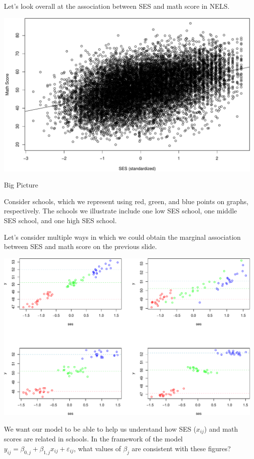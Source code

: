 \documentclass[ignorenonframetext,]{beamer}
\begin{document}
\begin{frame}{}

Let's look overall at the association between SES and math score in
NELS.

\includegraphics[width=0.8\linewidth]{anova_06_deck_files/figure-beamer/scatter-1}

\end{frame}

\begin{frame}{Big Picture}

Consider schools, which we represent using red, green, and blue points
on graphs, respectively. The schools we illustrate include one low SES
school, one middle SES school, and one high SES school.

Let's consider multiple ways in which we could obtain the marginal
association between SES and math score on the previous slide.

\end{frame}

\begin{frame}{}

\includegraphics[width=0.6\linewidth]{anova_06_deck_files/figure-beamer/illustrateplot-1}

We want our model to be able to help us understand how SES (\(x_{ij}\))
and math scores are related in schools. In the framework of the model
\(y_{ij}=\beta_{0,j}+\beta_{1,j}x_{ij} + \varepsilon_{ij}\), what values
of \(\beta_{j}\) are consistent with these figures?

\end{frame}
\end{document}
